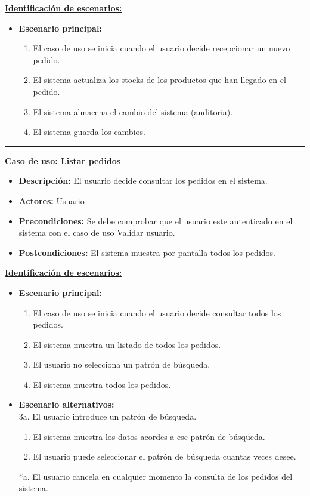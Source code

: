 \underline{\textbf{Identificación de escenarios:}}
\begin{itemize}\renewcommand{\labelitemi}{$\circ$}
 \item \textbf{Escenario principal:}
         \begin{enumerate}
          \item El caso de uso se inicia cuando el usuario decide recepcionar un nuevo pedido.
          \item El sistema actualiza los stocks de los productos que han llegado en el pedido.
 	  \item El sistema almacena el cambio del sistema (auditoria).
          \item El sistema guarda los cambios.
       \end{enumerate}
\end{itemize}

\smallskip
\hrule height 1pt
\smallskip
\textbf{Caso de uso: Listar pedidos}
\begin{itemize}\renewcommand{\labelitemi}{$\cdot$}
 \item \textbf{Descripción:} El usuario decide consultar los pedidos en el sistema.
  \item \textbf{Actores:} Usuario
  \item \textbf{Precondiciones:} Se debe comprobar que el usuario este autenticado en el sistema con el caso de uso Validar usuario.
  \item \textbf{Postcondiciones:} El sistema muestra por pantalla todos los pedidos.
\end{itemize}
\underline{\textbf{Identificación de escenarios:}}
\begin{itemize}\renewcommand{\labelitemi}{$\circ$}
 \item \textbf{Escenario principal:}
         \begin{enumerate}
          \item El caso de uso se inicia cuando el usuario decide consultar todos los pedidos.
          \item El sistema muestra un listado de todos los pedidos.
          \item El usuario no selecciona un patrón de búsqueda.
          \item El sistema muestra todos los pedidos.
         \end{enumerate}
  \item \textbf{Escenario alternativos:}\\
  			3a. El usuario introduce un patrón de búsqueda.
  			\begin{enumerate}
  			\item El sistema muestra los datos acordes a ese patrón de búsqueda.
  			\item El usuario puede seleccionar el patrón de búsqueda cuantas veces desee.
  			\end{enumerate}
          *a. El usuario cancela en cualquier momento la consulta de los pedidos del sistema.
\end{itemize}

